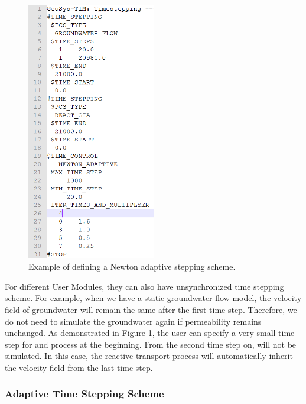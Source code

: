 \begin{figure}
\includegraphics[width=0.5\textwidth]{RT/figs/RT_fig_adapt_tim}
\caption{Example of defining a Newton adaptive stepping scheme. }
\label{fig:RT_fig_adapt_tim}
\end{figure}

For different User Modules, they can also have unsynchronized time stepping scheme. For example, when we have a static groundwater flow model, the velocity field of groundwater will remain the same after the first time step. Therefore, we do not need to simulate the groundwater again if permeability remains unchanged. As demonstrated in Figure \ref{fig:RT_fig_adapt_tim}, the user can specify a very small time step for  and  process at the beginning. From the second time step on,  will not be simulated. In this case, the reactive transport process will automatically inherit the velocity field from the last time step.

\subsubsection{Adaptive Time Stepping Scheme}

